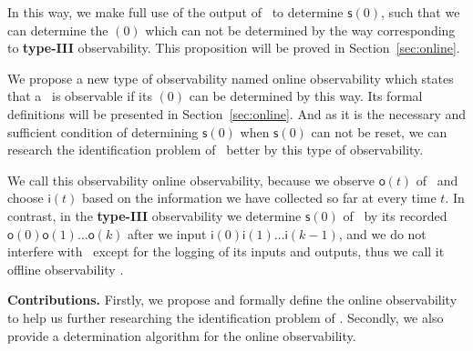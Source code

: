  In this way, we make full use of the output of \BCN\ to determine $\mathsf{s}(0)$, such that we can determine the \State$(0)$ which can not be determined by the way corresponding to {\bf type-III} observability. This proposition will be proved in Section~\ref{sec:online}. 
 
 We propose a new type of observability named online observability which states that a \BCN\ is observable if its \State$(0)$ can be determined by this way. Its formal definitions will be presented in Section~\ref{sec:online}. And as it is the necessary and sufficient condition of determining $\mathsf{s}(0)$ when $\mathsf{s}(0)$ can not be reset, we can research the identification problem of \BCNs\ better by this type of observability.

We call this observability online observability, because we observe $\mathsf{o}(t)$ of \BCN\ and choose $\mathsf{i}(t)$ based on the information we have collected so far at every time $t$. In contrast, in the {\bf type-III} observability we determine $\mathsf{s}(0)$ of \BCN\ by its recorded $\mathsf{o}(0)\mathsf{o}(1)\ldots\mathsf{o}(k)$ after we input $\mathsf{i}(0)\mathsf{i}(1)\ldots\mathsf{i}(k-1)$, and  we do not interfere with \BCN\ except for the logging of its inputs and outputs, thus we call it offline observability \cite{Cassar2017A}.


\medskip\noindent
{\bf Contributions.}
Firstly, we propose and formally define the online observability to help us further researching the identification problem of \BCN. %
Secondly, we also provide a determination algorithm for the online observability. %

